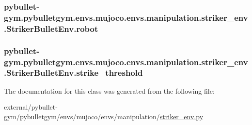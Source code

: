 \subsubsection[{\texorpdfstring{robot}{robot}}]{\setlength{\rightskip}{0pt plus 5cm}pybullet-\/gym.\+pybulletgym.\+envs.\+mujoco.\+envs.\+manipulation.\+striker\+\_\+env.\+Striker\+Bullet\+Env.\+robot}\hypertarget{classpybullet-gym_1_1pybulletgym_1_1envs_1_1mujoco_1_1envs_1_1manipulation_1_1striker__env_1_1_striker_bullet_env_ae3fa8a2dd2849df3a5137209b7fae562}{}\label{classpybullet-gym_1_1pybulletgym_1_1envs_1_1mujoco_1_1envs_1_1manipulation_1_1striker__env_1_1_striker_bullet_env_ae3fa8a2dd2849df3a5137209b7fae562}
\subsubsection[{\texorpdfstring{strike\+\_\+threshold}{strike_threshold}}]{\setlength{\rightskip}{0pt plus 5cm}pybullet-\/gym.\+pybulletgym.\+envs.\+mujoco.\+envs.\+manipulation.\+striker\+\_\+env.\+Striker\+Bullet\+Env.\+strike\+\_\+threshold}\hypertarget{classpybullet-gym_1_1pybulletgym_1_1envs_1_1mujoco_1_1envs_1_1manipulation_1_1striker__env_1_1_striker_bullet_env_a5e8a74917ab31d891580fa222e4cbb19}{}\label{classpybullet-gym_1_1pybulletgym_1_1envs_1_1mujoco_1_1envs_1_1manipulation_1_1striker__env_1_1_striker_bullet_env_a5e8a74917ab31d891580fa222e4cbb19}


The documentation for this class was generated from the following file\+:\begin{DoxyCompactItemize}
\item 
external/pybullet-\/gym/pybulletgym/envs/mujoco/envs/manipulation/\hyperlink{mujoco_2envs_2manipulation_2striker__env_8py}{striker\+\_\+env.\+py}\end{DoxyCompactItemize}

